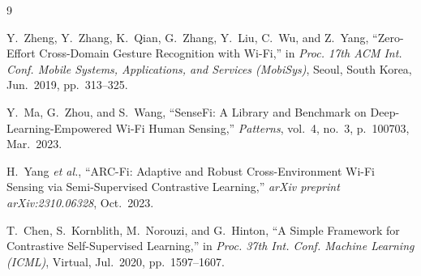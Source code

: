 \documentclass[journal]{IEEEtran}
\begin{document}

\begin{thebibliography}{9}

Y.~Zheng, Y.~Zhang, K.~Qian, G.~Zhang, Y.~Liu, C.~Wu, and Z.~Yang,
``Zero-Effort Cross-Domain Gesture Recognition with Wi-Fi,''
in \emph{Proc. 17th ACM Int. Conf. Mobile Systems, Applications, and
Services (MobiSys)}, Seoul, South Korea, Jun.\ 2019, pp.~313--325.

Y.~Ma, G.~Zhou, and S.~Wang,
``SenseFi: A Library and Benchmark on Deep-Learning-Empowered Wi-Fi
Human Sensing,''
\emph{Patterns}, vol.~4, no.~3, p.~100703, Mar.\ 2023.

H.~Yang \textit{et al.},
``ARC-Fi: Adaptive and Robust Cross-Environment Wi-Fi Sensing via
Semi-Supervised Contrastive Learning,''
\emph{arXiv preprint arXiv:2310.06328}, Oct.\ 2023.

T.~Chen, S.~Kornblith, M.~Norouzi, and G.~Hinton,
``A Simple Framework for Contrastive Self-Supervised Learning,''
in \emph{Proc. 37th Int. Conf. Machine Learning (ICML)},
Virtual, Jul.\ 2020, pp.~1597--1607.

\end{thebibliography}
\end{document}
